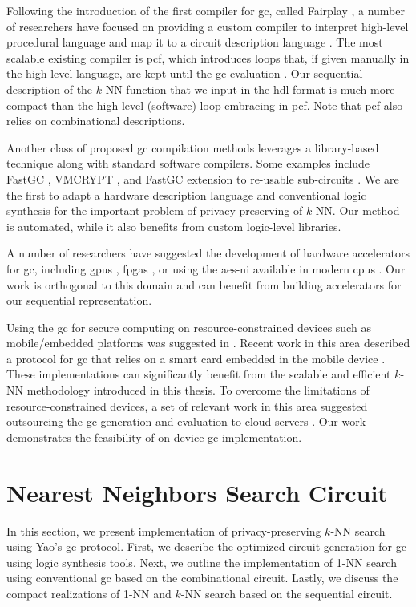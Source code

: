 Following the introduction of the first compiler for \acrshort{gc}, called Fairplay \cite{malkhi2004fairplay}, a number of researchers have focused on providing a custom compiler to interpret high-level procedural language and map it to a circuit description language \cite{henecka2010tasty,holzer2012secure}.
The most scalable existing compiler is \gls{pcf}, which introduces loops that, if given manually in the high-level language, are kept until the \acrshort{gc} evaluation \cite{kreuter2013pcf}.
Our sequential description of the $k$-NN function that we input in the \acrfull{hdl} format is much more compact than the high-level (software) loop embracing in \gls{pcf}.
Note that \gls{pcf} also relies on combinational descriptions.

Another class of proposed \acrshort{gc} compilation methods leverages a library-based technique along with standard software compilers.
Some examples include FastGC \cite{huang2011faster}, VMCRYPT \cite{malka2011vmcrypt}, and FastGC extension to re-usable sub-circuits \cite{henecka2013faster}.
We are the first to adapt a hardware description language and conventional logic synthesis for the important problem of privacy preserving of $k$-NN.
Our method is automated, while it also benefits from custom logic-level libraries.

A number of researchers have suggested the development of hardware accelerators for \acrshort{gc}, including \acrshort{gpu}s \cite{husted2013gpu,pu2013computing}, \acrshort{fpga}s \cite{jarvinen2010garbled}, or using the \acrshort{aes-ni} available in modern \acrshort{cpu}s \cite{bellare2013efficient}.
Our work is orthogonal to this domain and can benefit from building accelerators for our sequential representation.

Using the \acrshort{gc} for secure computing on resource-constrained devices such as mobile/embedded platforms was suggested in \cite{huang2011privacy}.
Recent work in this area described a protocol for \acrshort{gc} that relies on a smart card embedded in the mobile device \cite{demmler2014ad}.
These implementations can significantly benefit from the scalable and efficient $k$-NN methodology introduced in this thesis.
To overcome the limitations of resource-constrained devices, a set of relevant work in this area suggested outsourcing the \acrshort{gc} generation and evaluation to cloud servers \cite{carter2016secure,carter2014whitewash}.
Our work demonstrates the feasibility of on-device \acrshort{gc} implementation.

\section{Nearest Neighbors Search Circuit}\label{sec:knn-circuit}
In this section, we present implementation of privacy-preserving $k$-NN search using Yao's \acrshort{gc} protocol.
First, we describe the optimized circuit generation for \acrshort{gc} using logic synthesis tools.
Next, we outline the implementation of 1-NN search using conventional \acrshort{gc} based on the combinational circuit.
Lastly, we discuss the compact realizations of 1-NN and $k$-NN search based on the sequential circuit.

